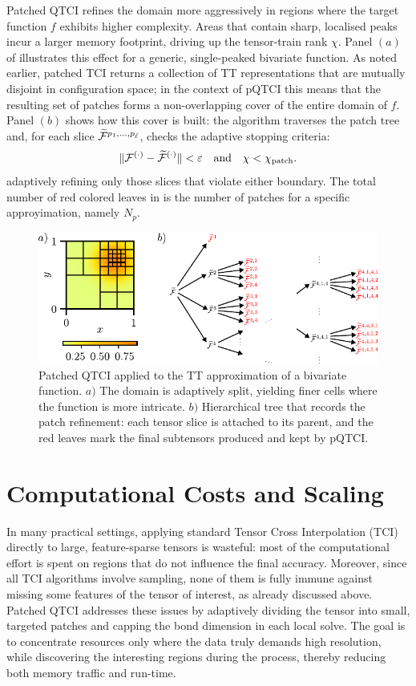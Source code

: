 Patched QTCI refines the domain more aggressively in regions where the target function $f$ exhibits higher complexity. Areas that contain sharp, localised peaks incur a larger memory footprint, driving up the tensor-train rank $\chi$. Panel $(a)$ of  illustrates this effect for a generic, single-peaked bivariate function. As noted earlier, patched TCI returns a collection of TT representations that are mutually disjoint in configuration space; in the context of pQTCI this means that the resulting set of patches forms a non-overlapping cover of the entire domain of $f$. Panel $(b)$ shows how this cover is built: the algorithm traverses the patch tree and, for each slice $\widetilde{\mathcal{F}}^{p_1,\dots,p_{\bar\ell}}$, checks the adaptive stopping criteria: 
\begin{equation}
	\| \mathcal{F}^{(\cdot)} - \widetilde{\mathcal{F}}^{(\cdot)} \| < \varepsilon \quad \text{and} \quad \chi < \chi_{\text{patch}}.
	\label{eq:patchConvergence}
\end{equation}
adaptively refining only those slices that violate either boundary. The total number of red colored leaves in  is the number of patches for a specific approyimation, namely $N_p$.
\begin{figure}[ht!]
	\includegraphics{figures/PatchingTree.pdf}
	\caption{Patched QTCI applied to the TT approximation of a bivariate function. $a)$ The domain is adaptively split, yielding finer cells where the function is more intricate. $b)$ Hierarchical tree that records the patch refinement: each tensor slice is attached to its parent, and the red leaves mark the final subtensors produced and kept by pQTCI. }
	\label{fig:patchTree}
\end{figure}

\section{Computational Costs and Scaling}
\label{sec:patchingCost}


In many practical settings, applying standard Tensor Cross Interpolation (TCI) directly to large, feature-sparse tensors is wasteful: most of the computational effort is spent on regions that do not influence the final accuracy. Moreover,
since all TCI algorithms involve sampling, none of them is fully immune against missing some features of the tensor of interest, as already discussed above. Patched QTCI addresses these issues by adaptively dividing the tensor into small, targeted patches and capping the bond dimension in each local solve. The goal is to concentrate resources only where the data truly demands high resolution, while discovering the interesting regions during the process, thereby reducing both memory traffic and run-time.

